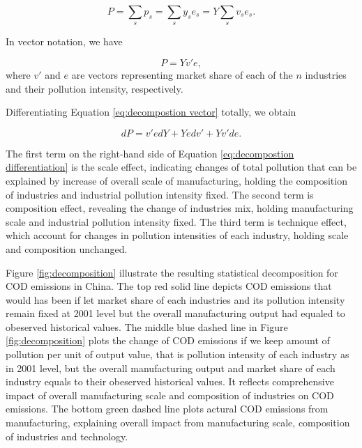 \documentclass[12pt,english]{article}
\begin{document}
\begin{equation} \label{eq:decompostion}
P=\sum_{s} p_{s}=\sum_{s}y_{s}e_{s}=Y\sum_{s}v_{s}e_{s}.
\end{equation}

In vector notation, we have

\begin{equation}\label{eq:decompostion vector}
P=Yv'e,
\end{equation}
where $v'$ and $e$ are vectors representing market share of each of the $n$ industries and their pollution intensity, respectively.

Differentiating Equation \ref{eq:decompostion vector} totally, we obtain

\begin{equation}\label{eq:decompostion differentiation}
dP=v'edY+Yedv'+Yv'de.
\end{equation}

The first term on the right-hand side of Equation \ref{eq:decompostion differentiation} is the scale effect, indicating changes of total pollution that can be explained by increase of overall scale of manufacturing, holding the composition of industries and industrial pollution intensity fixed. The second term is composition effect, revealing the change of industries mix, holding manufacturing scale and industrial pollution intensity fixed. The third term is technique effect, which account for changes in pollution intensities of each industry, holding scale and composition unchanged.

Figure \ref{fig:decomposition} illustrate the resulting statistical decomposition for COD emissions in China. The top red solid line depicts COD emissions that would has been if let market share of each industries and its pollution intensity remain fixed at 2001 level but the overall manufacturing output had equaled to obeserved historical values. The middle blue dashed line in Figure \ref{fig:decomposition} plots the change of COD emissions if we keep amount of pollution per unit of output value, that is pollution intensity of each industry as in 2001 level, but the overall manufacturing output and market share of each industry equals to their obeserved historical values. It reflects comprehensive impact of overall manufacturing scale and composition of industries on COD emissions. The bottom green dashed line plots actural COD emissions from manufacturing, explaining overall impact from manufacturing scale, composition of industries and technology.
\end{document}
